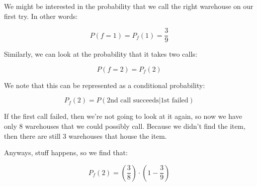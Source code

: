 \documentclass{article}
\begin{document}
We might be interested in the probability that we call the right
warehouse on our first try. In other words:

\[
P(f=1)=P_f(1)=\frac{3}{9}
\]

Similarly, we can look at the probability that it takes two calls:

\[
P(f=2)=P_f(2)
\]

We note that this can be represented as a conditional probability:

\[
P_f(2)=P(\text{2nd call succeeds}|\text{1st failed})
\]

If the first call failed, then we're not going to look at it again, so
now we have only 8 warehouses that we could possibly call. Because we
didn't find the item, then there are still 3 warehouses that house the
item.

Anyways, stuff happens, so we find that:

\[
P_f(2)=(\frac{3}{8})\cdot(1-\frac{3}{9})
\]
\end{document}
